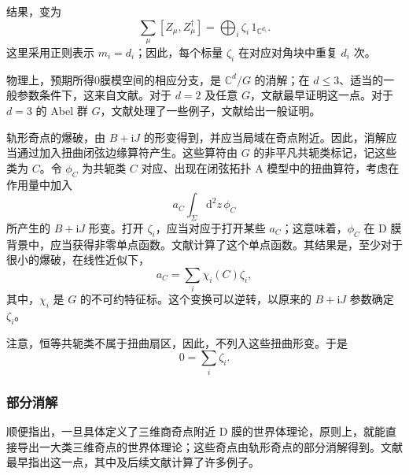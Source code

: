 结果，变为
\begin{equation}\label{eq:5.108}
\sum_\mu[Z_\mu,Z_\mu^\dagger]
=\bigoplus_i\zeta_i\,1_{\mathbb{C}^{d_i}}.
\end{equation}
这里采用正则表示 $m_i=d_i$；因此，每个标量 $\zeta_i$ 在对应对角块中重复 $d_i$ 次。

物理上，预期所得0膜模空间的相应分支，是 $\mathbb{C}^d/G$ 的消解；在 $d\le3$、适当的一般参数条件下，这来自文献。对于 $d=2$ 及任意 $G$，文献最早证明这一点。对于 $d=3$ 的 Abel 群 $G$，文献处理了一些例子，文献给出一般证明。

轨形奇点的爆破，由 $B+\mathrm{i}J$ 的形变得到，并应当局域在奇点附近。因此，消解应当通过加入扭曲闭弦边缘算符产生。这些算符由 $G$ 的非平凡共轭类标记，记这些类为 $C$。令 $\phi_C$ 为共轭类 $C$ 对应、出现在闭弦拓扑 A 模型中的扭曲算符，考虑在作用量中加入
\begin{equation}\label{eq:5.109}
a_C\int_\Sigma\mathrm{d}^2z\,\phi_C
\end{equation}
所产生的 $B+\mathrm{i}J$ 形变。打开 $\zeta_i$，应当对应于打开某些 $a_C$；这意味着，$\phi_C$ 在 D 膜背景中，应当获得非零单点函数。文献计算了这个单点函数。其结果是，至少对于很小的爆破，在线性近似下，
\begin{equation}\label{eq:5.110}
a_C=\sum_i\chi_i(C)\zeta_i,
\end{equation}
其中，$\chi_i$ 是 $G$ 的不可约特征标。这个变换可以逆转，以原来的 $B+\mathrm{i}J$ 参数确定 $\zeta_i$。

注意，恒等共轭类不属于扭曲扇区，因此，不列入这些扭曲形变。于是
\begin{equation}\label{eq:5.111}
0=\sum_i\zeta_i.
\end{equation}

\subsubsection{部分消解}\label{sec:5.4.5.4}

顺便指出，一旦具体定义了三维商奇点附近 D 膜的世界体理论，原则上，就能直接导出一大类三维奇点的世界体理论；这些奇点由轨形奇点的部分消解得到。文献最早指出这一点，其中及后续文献计算了许多例子。

